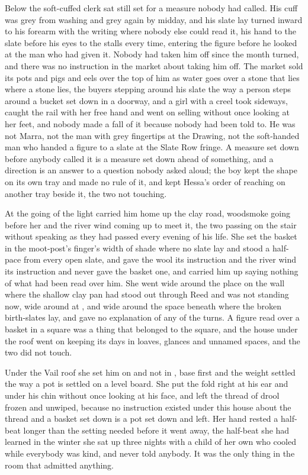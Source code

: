 Below  the soft-cuffed clerk sat still set for a measure nobody had called. His cuff was grey from washing and grey again by midday, and his slate lay turned inward to his forearm with the writing where nobody else could read it, his hand to the slate before his eyes to the stalls every time, entering the figure before he looked at the man who had given it. Nobody had taken him off since the month turned, and there was no instruction in the market about taking him off. The market sold its pots and pigs and eels over the top of him as water goes over a stone that lies where a stone lies, the buyers stepping around his slate the way a person steps around a bucket set down in a doorway, and a girl with a creel took  sideways, caught the rail with her free hand and went on selling without once looking at her feet, and nobody made a fall of it because nobody had been told to. He was not Marra, not the man with grey fingertips at the Drawing, not the soft-handed man who handed a figure to a slate at the Slate Row fringe. A measure set down before anybody called it is a measure set down ahead of something, and a direction is an answer to a question nobody asked aloud; the boy kept the shape on its own tray and made no rule of it, and kept Hessa's order of reaching on another tray beside it, the two not touching.

\scenebreak

At the going of the light  carried him home up the clay road, woodsmoke going before her and the river wind coming up to meet it, the two passing on the stair without speaking as they had passed every evening of his life. She set the basket in the moot-post's finger's width of shade where no slate lay and stood a half-pace from every open slate, and gave the wool its instruction and the river wind its instruction and never gave the basket one, and carried him up saying nothing of what had been read over him. She went wide around the place on the wall where the shallow clay pan had stood out through Reed and was not standing now, wide around  at , and wide around the space beneath  where the broken birth-slates lay, and gave no explanation of any of the turns. A figure read over a basket in a square was a thing that belonged to the square, and the house under the roof went on keeping its days in loaves, glances and unnamed spaces, and the two did not touch.

Under the Vail roof she set him on  and not in , base first and the weight settled the way a pot is settled on a level board. She put the fold right at his ear and under his chin without once looking at his face, and left the thread of drool frozen and unwiped, because no instruction existed under this house about the thread and a basket set down is a pot set down and left. Her hand rested a half-beat longer than the setting needed before it went away, the half-beat she had learned in the winter she sat up three nights with a child of her own who cooled while everybody was kind, and never told anybody. It was the only thing in the room that admitted anything.

